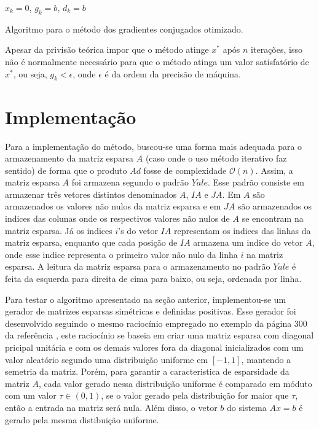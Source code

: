 \documentclass [a4paper,10pt]{article}
\begin{document}
{    \begin{algorithm}[!ht]
        $x_k = 0$, $g_k = b$, $d_k = b$\\
        \caption{\small Algoritmo para  o método dos gradientes conjugados otimizado.}
    \end{algorithm}

    Apesar da privisão teórica impor que o método atinge $x^*$ após $n$ iterações, isso não é normalmente necessário
    para que o método atinga um valor satisfatório de $x^*$, ou seja, $g_k < \epsilon$, onde $\epsilon$ é da ordem
    da precisão de máquina.

    \section{Implementação}
    Para a implementação do método, buscou-se uma forma mais adequada para o armazenamento da matriz esparsa $A$ (caso
    onde o uso método iterativo faz sentido) de forma que o produto $Ad$ fosse de complexidade $\mathcal{O}(n)$.
    Assim, a matriz esparsa $A$ foi armazena segundo o padrão $Yale$. Esse padrão consiste em armazenar três vetores
    distintos denominados $A$, $IA$ e $JA$. Em $A$ são armazenados os valores não nulos da matriz esparsa e em $JA$ são
    armazenados os indices das colunas onde os respectivos valores não nulos de $A$ se encontram na matriz esparsa. Já
    os indices $i$'s do vetor $IA$ representam os indices das linhas da matriz esparsa, enquanto que cada posição de $IA$
    armazena um indice do vetor $A$, onde esse indice representa o primeiro valor não nulo da linha $i$ na matriz esparsa.
    A leitura da matriz esparsa para o armazenamento no padrão $Yale$ é feita da esquerda para direita de cima para baixo, ou
    seja, ordenada por linha.

    Para testar o algoritmo apresentado na seção anterior, implementou-se um gerador de matrizes esparsas simétricas e definidas
    positivas. Esse gerador foi desenvolvido seguindo o mesmo raciocínio empregado no exemplo da página 300 da referência
    \cite{livro1}, este raciocínio se baseia em criar uma matriz esparsa com diagonal pricipal unitária e com os demais valores fora da diagonal
    inicializados com um valor aleatório segundo uma distribuição uniforme em $[-1, 1]$, mantendo a semetria da matriz. Porém, para
    garantir a caracteristica de esparsidade da matriz $A$, cada valor gerado nessa distribuição uniforme é comparado em móduto com
    um valor $\tau \in (0, 1)$, se o valor gerado pela distribuição for maior que $\tau$, então a entrada na matriz será nula. Além disso, 
    o vetor $b$ do sistema $Ax = b$ é gerado pela mesma distibuição uniforme.

}
\end{document}
